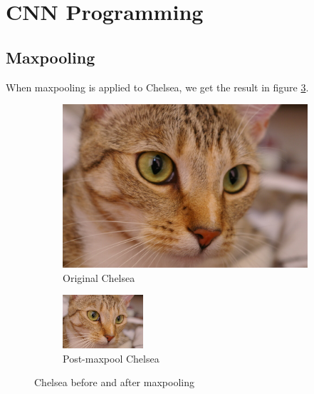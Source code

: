 \documentclass[]{article}
\begin{document}
\section{CNN Programming}
\subsection{Maxpooling}
When maxpooling is applied to Chelsea, we get the result in figure \ref{fig:chelsea}.
\begin{figure}[H]
     \centering
     \begin{subfigure}[b]{0.6\textwidth}
         \centering
         \includegraphics[width=\textwidth]{chelsea}
         \caption{Original Chelsea}
         \label{fig:chelsea_before}
     \end{subfigure}
     \hfill
     \begin{subfigure}[b]{0.3\textwidth}
         \centering
         \includegraphics[width=\textwidth]{chelsea_maxpooled}
         \caption{Post-maxpool Chelsea}
         \label{fig:chelsea_after}
     \end{subfigure}
    \caption{Chelsea before and after maxpooling}
    \label{fig:chelsea}
\end{figure}
\end{document}
